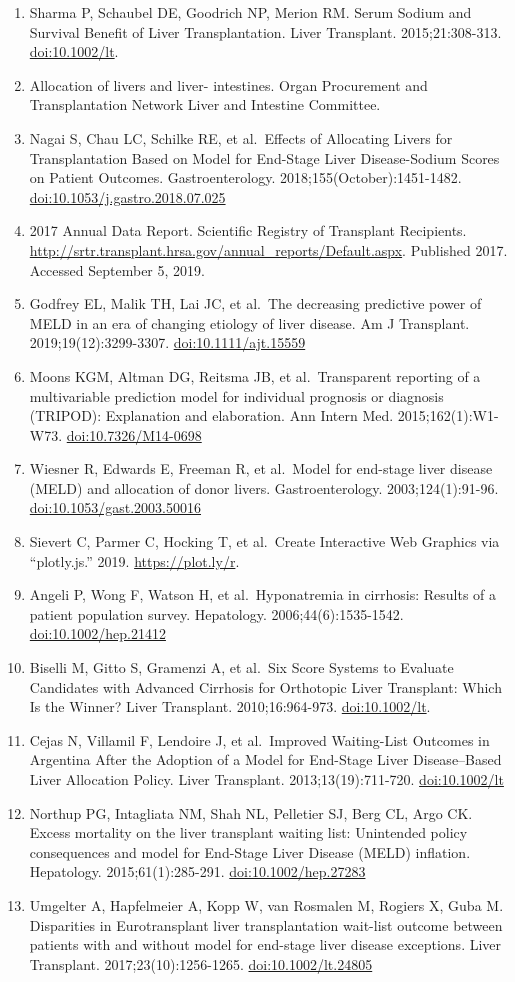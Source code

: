 \documentclass[11pt,english,]{book} %
\begin{document}
\begin{enumerate}
\item
  Sharma P, Schaubel DE, Goodrich NP, Merion RM. Serum Sodium and Survival Benefit of Liver Transplantation. Liver Transplant. 2015;21:308-313. \url{doi:10.1002/lt}.
\item
  Allocation of livers and liver- intestines. Organ Procurement and Transplantation Network Liver and Intestine Committee.
\item
  Nagai S, Chau LC, Schilke RE, et al.~Effects of Allocating Livers for Transplantation Based on Model for End-Stage Liver Disease-Sodium Scores on Patient Outcomes. Gastroenterology. 2018;155(October):1451-1482. \url{doi:10.1053/j.gastro.2018.07.025}
\item
  2017 Annual Data Report. Scientific Registry of Transplant Recipients. \url{http://srtr.transplant.hrsa.gov/annual_reports/Default.aspx}. Published 2017. Accessed September 5, 2019.
\item
  Godfrey EL, Malik TH, Lai JC, et al.~The decreasing predictive power of MELD in an era of changing etiology of liver disease. Am J Transplant. 2019;19(12):3299-3307. \url{doi:10.1111/ajt.15559}
\item
  Moons KGM, Altman DG, Reitsma JB, et al.~Transparent reporting of a multivariable prediction model for individual prognosis or diagnosis (TRIPOD): Explanation and elaboration. Ann Intern Med. 2015;162(1):W1-W73. \url{doi:10.7326/M14-0698}
\item
  Wiesner R, Edwards E, Freeman R, et al.~Model for end-stage liver disease (MELD) and allocation of donor livers. Gastroenterology. 2003;124(1):91-96. \url{doi:10.1053/gast.2003.50016}
\item
  Sievert C, Parmer C, Hocking T, et al.~Create Interactive Web Graphics via ``plotly.js.'' 2019. \url{https://plot.ly/r}.
\item
  Angeli P, Wong F, Watson H, et al.~Hyponatremia in cirrhosis: Results of a patient population survey. Hepatology. 2006;44(6):1535-1542. \url{doi:10.1002/hep.21412}
\item
  Biselli M, Gitto S, Gramenzi A, et al.~Six Score Systems to Evaluate Candidates with Advanced Cirrhosis for Orthotopic Liver Transplant: Which Is the Winner? Liver Transplant. 2010;16:964-973. \url{doi:10.1002/lt}.
\item
  Cejas N, Villamil F, Lendoire J, et al.~Improved Waiting-List Outcomes in Argentina After the Adoption of a Model for End-Stage Liver Disease--Based Liver Allocation Policy. Liver Transplant. 2013;13(19):711-720. \url{doi:10.1002/lt}
\item
  Northup PG, Intagliata NM, Shah NL, Pelletier SJ, Berg CL, Argo CK. Excess mortality on the liver transplant waiting list: Unintended policy consequences and model for End-Stage Liver Disease (MELD) inflation. Hepatology. 2015;61(1):285-291. \url{doi:10.1002/hep.27283}
\item
  Umgelter A, Hapfelmeier A, Kopp W, van Rosmalen M, Rogiers X, Guba M. Disparities in Eurotransplant liver transplantation wait-list outcome between patients with and without model for end-stage liver disease exceptions. Liver Transplant. 2017;23(10):1256-1265. \url{doi:10.1002/lt.24805}
\end{enumerate}
\end{document}
